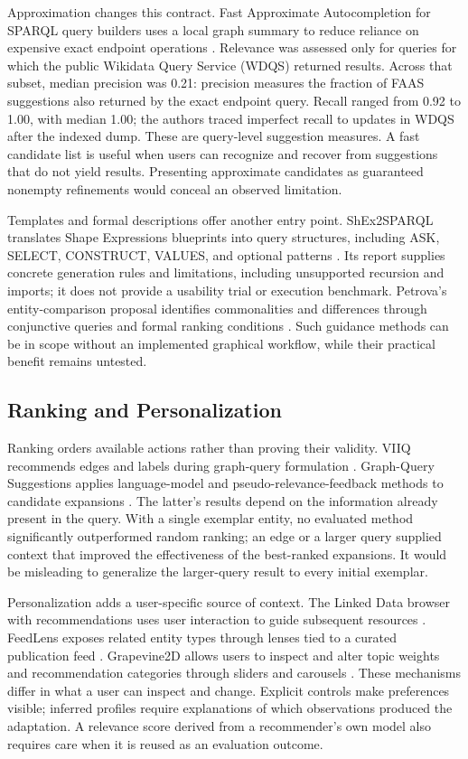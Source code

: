 \documentclass[manuscript,review,screen]{acmart}
\begin{document}
Approximation changes this contract. Fast Approximate Autocompletion for SPARQL query builders uses a local graph summary to reduce reliance on expensive exact endpoint operations \citep{2021_Parra_Fast_Approximate}. Relevance was assessed only for queries for which the public Wikidata Query Service (WDQS) returned results. Across that subset, median precision was 0.21: precision measures the fraction of FAAS suggestions also returned by the exact endpoint query. Recall ranged from 0.92 to 1.00, with median 1.00; the authors traced imperfect recall to updates in WDQS after the indexed dump. These are query-level suggestion measures. A fast candidate list is useful when users can recognize and recover from suggestions that do not yield results. Presenting approximate candidates as guaranteed nonempty refinements would conceal an observed limitation.

Templates and formal descriptions offer another entry point. ShEx2SPARQL translates Shape Expressions blueprints into query structures, including ASK, SELECT, CONSTRUCT, VALUES, and optional patterns \citep{V3-01110}. Its report supplies concrete generation rules and limitations, including unsupported recursion and imports; it does not provide a usability trial or execution benchmark. Petrova's entity-comparison proposal identifies commonalities and differences through conjunctive queries and formal ranking conditions \citep{V3-00633}. Such guidance methods can be in scope without an implemented graphical workflow, while their practical benefit remains untested.

\subsection{Ranking and Personalization}
Ranking orders available actions rather than proving their validity. VIIQ recommends edges and labels during graph-query formulation \citep{2015_Jayaram_VIIQ_auto-suggestion}. Graph-Query Suggestions applies language-model and pseudo-relevance-feedback methods to candidate expansions \citep{2020_Lissandrini_Graph-Query_Suggestions}. The latter's results depend on the information already present in the query. With a single exemplar entity, no evaluated method significantly outperformed random ranking; an edge or a larger query supplied context that improved the effectiveness of the best-ranked expansions. It would be misleading to generalize the larger-query result to every initial exemplar.

Personalization adds a user-specific source of context. The Linked Data browser with recommendations uses user interaction to guide subsequent resources \citep{2018_Durao_A_Linked}. FeedLens exposes related entity types through lenses tied to a curated publication feed \citep{V3-01126}. Grapevine2D allows users to inspect and alter topic weights and recommendation categories through sliders and carousels \citep{V3-00694}. These mechanisms differ in what a user can inspect and change. Explicit controls make preferences visible; inferred profiles require explanations of which observations produced the adaptation. A relevance score derived from a recommender's own model also requires care when it is reused as an evaluation outcome.
\end{document}
